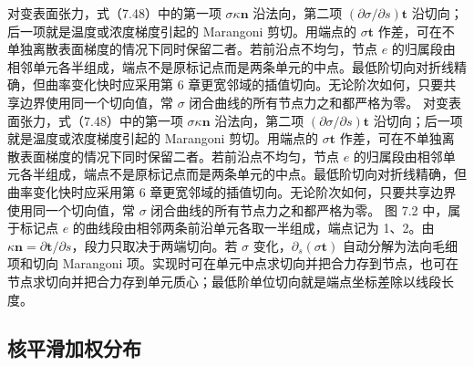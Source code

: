 \documentclass[11pt,a4paper,openany,fontset=none]{ctexbook}
\begin{document}
对变表面张力，式（7.48）中的第一项 $\sigma\kappa\boldsymbol n$ 沿法向，第二项 $(\partial\sigma/\partial s)\boldsymbol t$ 沿切向；后一项就是温度或浓度梯度引起的 Marangoni 剪切。用端点的 $\sigma\boldsymbol t$ 作差，可在不单独离散表面梯度的情况下同时保留二者。若前沿点不均匀，节点 $e$ 的归属段由相邻单元各半组成，端点不是原标记点而是两条单元的中点。最低阶切向对折线精确，但曲率变化快时应采用第 6 章更宽邻域的插值切向。无论阶次如何，只要共享边界使用同一个切向值，常 $\sigma$ 闭合曲线的所有节点力之和都严格为零。
对变表面张力，式（7.48）中的第一项 $\sigma\kappa\boldsymbol n$ 沿法向，第二项 $(\partial\sigma/\partial s)\boldsymbol t$ 沿切向；后一项就是温度或浓度梯度引起的 Marangoni 剪切。用端点的 $\sigma\boldsymbol t$ 作差，可在不单独离散表面梯度的情况下同时保留二者。若前沿点不均匀，节点 $e$ 的归属段由相邻单元各半组成，端点不是原标记点而是两条单元的中点。最低阶切向对折线精确，但曲率变化快时应采用第 6 章更宽邻域的插值切向。无论阶次如何，只要共享边界使用同一个切向值，常 $\sigma$ 闭合曲线的所有节点力之和都严格为零。
图 7.2 中，属于标记点 $e$ 的曲线段由相邻两条前沿单元各取一半组成，端点记为 1、2。由 $\kappa\boldsymbol n=\partial\boldsymbol t/\partial s$，段力只取决于两端切向。若 $\sigma$ 变化，$\partial_s(\sigma\boldsymbol t)$ 自动分解为法向毛细项和切向 Marangoni 项。实现时可在单元中点求切向并把合力存到节点，也可在节点求切向并把合力存到单元质心；最低阶单位切向就是端点坐标差除以线段长度。
\subsection{核平滑加权分布}
\end{document}
